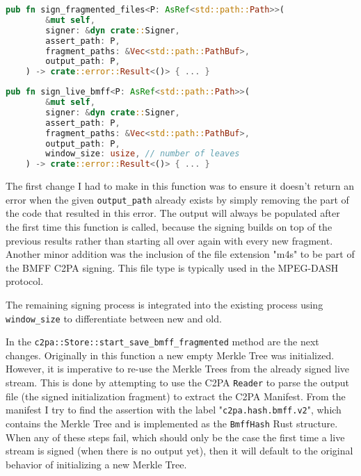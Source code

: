 \begin{minipage}{0.95\linewidth}
\begin{lstlisting}[caption={Original Signing Function}, label=code:fragment_bmff, language=Rust, captionpos=b]
    pub fn sign_fragmented_files<P: AsRef<std::path::Path>>(
        &mut self,
        signer: &dyn crate::Signer,
        assert_path: P,
        fragment_paths: &Vec<std::path::PathBuf>,
        output_path: P,
    ) -> crate::error::Result<()> { ... }
\end{lstlisting}
\end{minipage}

\begin{minipage}{0.95\linewidth}
\begin{lstlisting}[caption={New Live Signing Function}, label=code:live_sign, language=Rust, captionpos=b]
    pub fn sign_live_bmff<P: AsRef<std::path::Path>>(
        &mut self,
        signer: &dyn crate::Signer,
        assert_path: P,
        fragment_paths: &Vec<std::path::PathBuf>,
        output_path: P,
        window_size: usize, // number of leaves
    ) -> crate::error::Result<()> { ... }
\end{lstlisting}
\end{minipage}

The first change I had to make in this function was to ensure it doesn't return an error when the given \texttt{output\_path} already exists by simply removing the part of the code that resulted in this error. The output will always be populated after the first time this function is called, because the signing builds on top of the previous results rather than starting all over again with every new fragment. Another minor addition was the inclusion of the file extension "m4s" to be part of the BMFF C2PA signing. This file type is typically used in the MPEG-DASH protocol.

The remaining signing process is integrated into the existing process using \texttt{window\_size} to differentiate between new and old.

In the \texttt{c2pa::Store::start\_save\_bmff\_fragmented} method are the next changes. Originally in this function a new empty Merkle Tree was initialized. However, it is imperative to re-use the Merkle Trees from the already signed live stream. This is done by attempting to use the C2PA \texttt{Reader} to parse the output file (the signed initialization fragment) to extract the C2PA Manifest. From the manifest I try to find the assertion with the label "\texttt{c2pa.hash.bmff.v2}", which contains the Merkle Tree and is implemented as the \texttt{BmffHash} Rust structure. When any of these steps fail, which should only be the case the first time a live stream is signed (when there is no output yet), then it will default to the original behavior of initializing a new Merkle Tree.

